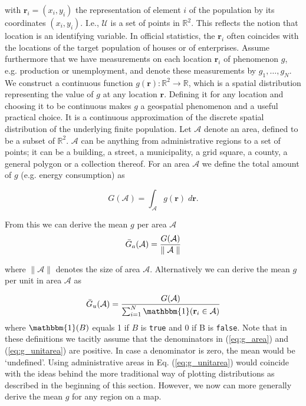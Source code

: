 with $\mathbf{r}_i = (x_i, y_i)$ the representation of element $i$ of the population by its 
coordinates $(x_i, y_i)$. I.e., $\mathcal{U}$ is a
set of points in $\mathbb{R}^2$. 
This reflects the notion that location is an identifying
variable. In official statistics, the $\mathbf{r}_i$ often coincides with the locations of the
target population of houses or of enterprises. Assume furthermore that we have
measurements on each location $\mathbf{r}_i$ of phenomenon $g$, e.g. production or 
unemployment, and denote these measurements by $g_1,\ldots,g_N$.
We construct a 
continuous function $g(\mathbf{r}) : \mathbb{R}^2 \xrightarrow{} \mathbb{R}$, which is a spatial 
distribution representing the value of $g$ at any location $\mathbf{r}$. Defining it for any location and choosing it to be continuous makes $g$ a geospatial
phenomenon and a useful practical choice.
It is a continuous approximation of the discrete spatial distribution
of the underlying finite population.
Let $\mathcal{A}$ denote an area, defined to be a subset of $\mathbb{R}^2$. $\mathcal{A}$ can be anything
from administrative regions to a set of points; it can be a building, a street, a
municipality, a grid square, a county, a general polygon or a collection thereof.
For an area $\mathcal{A}$ we define the total amount of $g$ (e.g. energy consumption) as

\begin{equation*}
G(\mathcal{A}) = \int_{\mathcal{A}} g(\textbf{r}) \; d\textbf{r}.
\end{equation*}

From this we can derive the mean $g$ per area $\mathcal{A}$
\begin{equation}
    \label{eq:g_area}
    \Bar{G}_a(\mathcal{A}) = \frac{G(\mathcal{A})}{\parallel \mathcal{A} \parallel}
\end{equation}

where $\parallel \mathcal{A} \parallel$ denotes the size of area $\mathcal{A}$. Alternatively we can derive the mean $g$ per unit in area $\mathcal{A}$ as

\begin{equation}
    \label{eq:g_unitarea}
    \Bar{G}_u(\mathcal{A}) = 
       \frac{G(\mathcal{A})}{\sum_{i=1}^{N} \mathbbm{1}(\mathbf{r}_i \in \mathcal{A})}
\end{equation}
where $\mathbbm{1}(B)$ equals 1 if $B$ is \texttt{true} and $0$ if B is \texttt{false}. Note that in these definitions
we tacitly assume that the denominators in (\ref{eq:g_area}) and (\ref{eq:g_unitarea}) are positive. In case a
denominator is zero, the mean would be ‘undefined’.
Using administrative areas in Eq. (\ref{eq:g_unitarea}) would coincide with the ideas behind
the more traditional way of plotting distributions as described in the beginning
of this section. However, we now can more generally derive the mean $g$ for any
region on a map.

